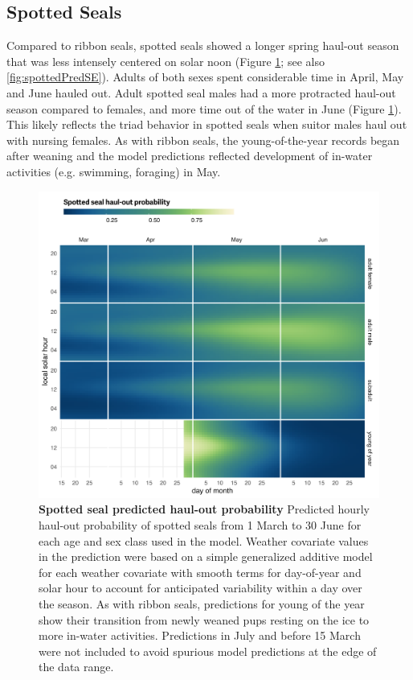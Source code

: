 \documentclass[fleqn,10pt,lineno]{wlpeerj} %
\begin{document}
\hypertarget{spotted-seals}{%
\subsection*{Spotted Seals}\label{spotted-seals}}

Compared to ribbon seals, spotted seals showed a longer spring haul-out season
that was less intensely centered on solar noon (Figure \ref{fig:spottedHOCal};
see also \ref{fig:spottedPredSE}). Adults of both sexes spent considerable time
in April, May and June hauled out. Adult spotted seal males had a more
protracted haul-out season compared to females, and more time out of the water
in June (Figure \ref{fig:spottedHOCal}). This likely reflects the triad
behavior in spotted seals when suitor males haul out with nursing females. As
with ribbon seals, the young-of-the-year records began after weaning and the
model predictions reflected development of in-water activities (e.g.
swimming, foraging) in May.



\begin{figure}
\includegraphics[width=1\linewidth]{../figures/spottedHOCal-1} \caption{\textbf{Spotted seal predicted haul-out probability} \linebreak Predicted hourly haul-out probability of spotted seals from 1 March to 30 June for each age and sex class used in the model. Weather covariate values in the prediction were based on a simple generalized additive model for each weather covariate with smooth terms for day-of-year and solar hour to account for anticipated variability within a day over the season. As with ribbon seals, predictions for young of the year show their transition from newly weaned pups resting on the ice to more in-water activities. Predictions in July and before 15 March were not included to avoid spurious model predictions at the edge of the data range.}\label{fig:spottedHOCal}
\end{figure}
\end{document}

